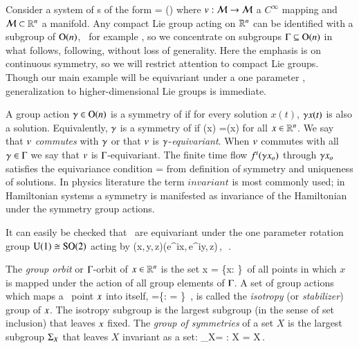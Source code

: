 

Consider a system of \ode s of the form
\beq
	\dot{\ssp} = \vf(\ssp)
	\label{eq:difeq}
\eeq
where $v: {\cal M} \rightarrow {\cal M}$ a $C^\infty$ mapping and ${\cal M}\subset\mathbb{R}^{n}$
a manifold. Any compact Lie group acting on $\mathbb{R}^{n}$ can be identified
with a subgroup of $\textrm{O}(n)$, \cf\ for example ,
so we concentrate on subgroups $\Gamma\subseteq\textrm{O}(n)$ in what
follows, following, without loss of generality.
%
Here the emphasis is on continuous symmetry, so we will
restrict attention to compact Lie groups. Though our main
example will be equivariant under a one parameter ,
generalization to higher-dimensional Lie groups is immediate.

A group action $\gamma\in\textrm{O}(n)$ is a symmetry of
 if for every solution $x(t)$, $\gamma x(t)$ is
also a solution. Equivalently, $\gamma$ is a symmetry of
 if 
\beq
	\vf(\LieEl x) =\LieEl \vf(x)
	\label{eq:equiv} 
\eeq 
for all $x\in\mathbb{R}^{n}$. We say that
$v$ \emph{commutes} with $\gamma$ or that $v$ is
$\gamma$-\emph{equivariant}. When $v$ commutes with all
$\gamma\in\Gamma$ we say that $v$ is $\Gamma$-equivariant.
The finite time flow ${f^{t}(\gamma x_o)}$ through $\gamma
x_o$ satisfies the equivariance condition
\beq\label{eq:equivFinite} =\LieEl{} \eeq from definition of symmetry and
uniqueness of solutions. In physics literature the term
$invariant$ is most commonly used; in
Hamiltonian systems a symmetry is manifested as invariance of the
Hamiltonian under the symmetry group actions.

It can easily be checked that \CLe\ are equivariant under the one parameter rotation
group $\textrm{U}(1)\cong\textrm{SO}(2)$ acting by
\beq\label{eq:SO2cle}
	(x,\,y,\,z)\mapsto (e^{i\theta}x,\,e^{i\theta}y,\,z)\,,\ \theta\in[0,2\pi]\,.
\eeq

The \emph{group orbit} or $\Gamma$-orbit of
$x\in\mathbb{R}^{n}$ is the set
\beq
	\Group x = \{\Glmn x: \Glmn\in\Group\}\,
\eeq
of all points in which $x$ is mapped under the action of all
group elements of $\Gamma$.
A set of group actions which maps a \statesp\ point $x$ into itself,
\beq
\stab{\ssp} =\{\Glmn \in \Group: \Glmn \ssp = \ssp \}
    \,,
is called the \emph{isotropy} (or \emph{stabilizer})  group of $\ssp$.
The isotropy subgroup is the largest subgroup (in the
sense of set inclusion) that leaves $\ssp$ fixed.
The \emph{group of symmetries} of a set $X$ is the largest
subgroup $\Subgroup_X$ that leaves $X$ invariant as a set:
\beq
	\Subgroup_X= {\Glmn: \Glmn X = X}\,.
\eeq

